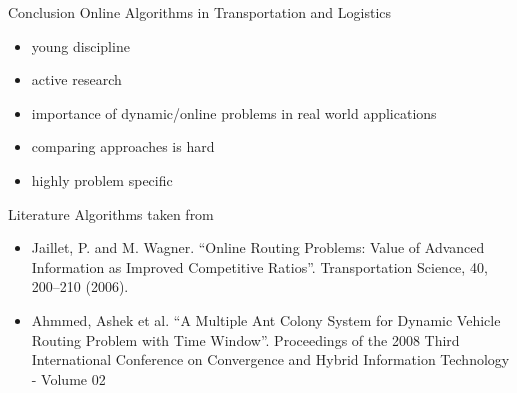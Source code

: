 \documentclass{beamer}
\begin{document}
\begin{frame}{}
  \begin{center}
    \structure{\Large \insertsection}
  \end{center}
\end{frame}

\begin{frame}{Conclusion}
  Online Algorithms in Transportation and Logistics
  \begin{itemize}
    \item young discipline
    \item active research
    \item importance of dynamic/online problems in real world applications
    \item comparing approaches is hard
    \item highly problem specific
  \end{itemize}
\end{frame}

\begin{frame}{Literature}
  Algorithms taken from
  \begin{itemize}
    \item Jaillet, P. and M. Wagner. ``Online Routing Problems: Value of Advanced Information as Improved Competitive Ratios''. Transportation Science, 40, 200--210 (2006).
    \item Ahmmed, Ashek et al. ``A Multiple Ant Colony System for Dynamic Vehicle Routing Problem with Time Window''. Proceedings of the 2008 Third International Conference on Convergence and Hybrid Information Technology - Volume 02
  \end{itemize}
\end{frame}

\begin{frame}{}
  \begin{center}
  \end{center}
\end{frame}
\end{document}
